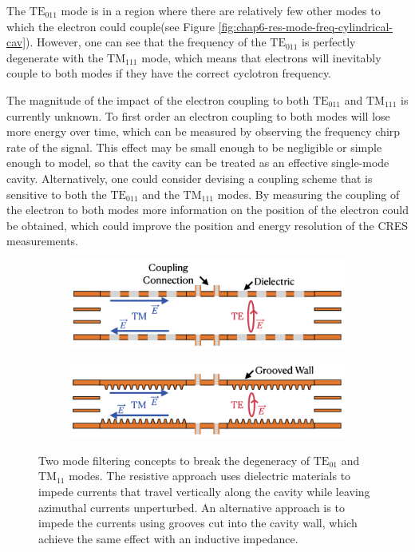 The $\mathrm{TE}_{011}$ mode is in a region where there are relatively few other modes to which the electron could couple(see Figure \ref{fig:chap6-res-mode-freq-cylindrical-cav}). However, one can see that the frequency of the $\mathrm{TE}_{011}$ is perfectly degenerate with the $\mathrm{TM}_{111}$ mode, which means that electrons will inevitably couple to both modes if they have the correct cyclotron frequency. 

The magnitude of the impact of the electron coupling to both $\mathrm{TE}_{011}$ and $\mathrm{TM}_{111}$ is currently unknown. To first order an electron coupling to both modes will lose more energy over time, which can be measured by observing the frequency chirp rate of the signal. This effect may be small enough to be negligible or simple enough to model, so that the cavity can be treated as an effective single-mode cavity. Alternatively, one could consider devising a coupling scheme that is sensitive to both the $\mathrm{TE}_{011}$ and the $\mathrm{TM}_{111}$ modes. By measuring the coupling of the electron to both modes more information on the position of the electron could be obtained, which could improve the position and energy resolution of the CRES measurements.

\begin{figure}[htbp]
    \centering
    \begin{subfigure}{0.7\textwidth}
        \centering
        \includegraphics*[width=\textwidth]{figs/Chapter-6/230608_insulator_mode_filter_cartoon.png}
        \caption{}
    \end{subfigure}
    \hfill
    \begin{subfigure}{0.7\textwidth}
        \centering
        \includegraphics*[width=\textwidth]{figs/Chapter-6/230608_grooved_mode_filter_cartoon.png}
        \caption{}
    \end{subfigure}
    \caption{\label{fig:chap6-mode-filter-cartoons} Two mode filtering concepts to break the degeneracy of $\mathrm{TE}_{01}$ and $\mathrm{TM}_{11}$ modes. The resistive approach uses dielectric materials to impede currents that travel vertically along the cavity while leaving azimuthal currents unperturbed. An alternative approach is to impede the currents using grooves cut into the cavity wall, which achieve the same effect with an inductive impedance.}
\end{figure}

